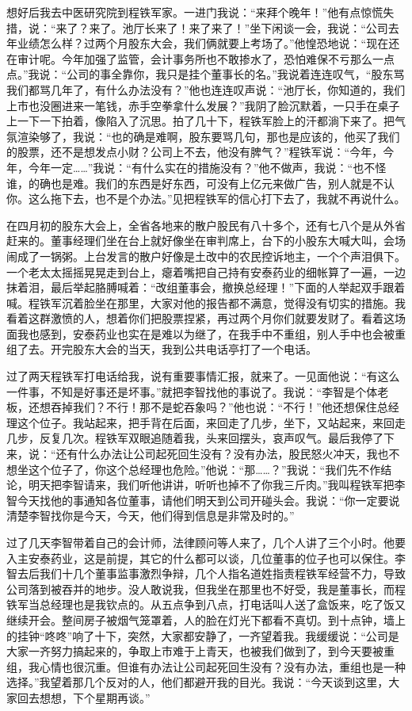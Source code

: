 \documentclass[12pt,oneside]{book}
\begin{document}
想好后我去中医研究院到程铁军家。一进门我说：``来拜个晚年！''他有点惊慌失措，说：``来了？来了。池厅长来了！来了来了！''坐下闲谈一会，我说：``公司去年业绩怎么样？过两个月股东大会，我们俩就要上考场了。''他惶恐地说：``现在还在审计呢。今年加强了监管，会计事务所也不敢掺水了，恐怕难保不亏那么一点点。''我说：``公司的事全靠你，我只是挂个董事长的名。''我说着连连叹气，``股东骂我们都骂几年了，有什么办法没有？''他也连连叹声说：``池厅长，你知道的，我们上市也没圈进来一笔钱，赤手空拳拿什么发展？''我阴了脸沉默着，一只手在桌子上一下一下拍着，像陷入了沉思。拍了几十下，程铁军脸上的汗都淌下来了。把气氛渲染够了，我说：``也的确是难啊，股东要骂几句，那也是应该的，他买了我们的股票，还不是想发点小财？公司上不去，他没有脾气？''程铁军说：``今年，今年，今年一定\ldots\ldots{}''我说：``有什么实在的措施没有？''他不做声，我说：``也不怪谁，的确也是难。我们的东西是好东西，可没有上亿元来做广告，别人就是不认你。这么拖下去，也不是个办法。''见把程铁军的信心打下去了，我就不再说什么。

在四月初的股东大会上，全省各地来的散户股民有八十多个，还有七八个是从外省赶来的。董事经理们坐在台上就好像坐在审判席上，台下的小股东大喊大叫，会场闹成了一锅粥。上台发言的散户好像是土改中的农民控诉地主，一个个声泪俱下。一个老太太摇摇晃晃走到台上，瘪着嘴把自己持有安泰药业的细帐算了一遍，一边抹着泪，最后举起胳膊喊着：``改组董事会，撤换总经理！''下面的人举起双手跟着喊。程铁军沉着脸坐在那里，大家对他的报告都不满意，觉得没有切实的措施。我看着这群激愤的人，想着你们把股票捏紧，再过两个月你们就要发财了。看着这场面我也感到，安泰药业也实在是难以为继了，在我手中不重组，别人手中也会被重组了去。开完股东大会的当天，我到公共电话亭打了一个电话。

过了两天程铁军打电话给我，说有重要事情汇报，就来了。一见面他说：``有这么一件事，不知是好事还是坏事。''就把李智找他的事说了。我说：``李智是个体老板，还想吞掉我们？不行！那不是蛇吞象吗？''他也说：``不行！''他还想保住总经理这个位子。我站起来，把手背在后面，来回走了几步，坐下，又站起来，来回走几步，反复几次。程铁军双眼追随着我，头来回摆头，哀声叹气。最后我停了下来，说：``还有什么办法让公司起死回生没有？没有办法，股民怒火冲天，我也不想坐这个位子了，你这个总经理也危险。''他说：``那\ldots\ldots ？''我说：``我们先不作结论，明天把李智请来，我们听他讲讲，听听也掉不了你我三斤肉。''我叫程铁军把李智今天找他的事通知各位董事，请他们明天到公司开碰头会。我说：``你一定要说清楚李智找你是今天，今天，他们得到信息是非常及时的。''

过了几天李智带着自己的会计师，法律顾问等人来了，几个人讲了三个小时。他要入主安泰药业，这是前提，其它的什么都可以谈，几位董事的位子也可以保住。李智去后我们十几个董事监事激烈争辩，几个人指名道姓指责程铁军经营不力，导致公司落到被吞并的地步。没人敢说我，但我坐在那里也不好受，我是董事长，而程铁军当总经理也是我钦点的。从五点争到八点，打电话叫人送了盒饭来，吃了饭又继续开会。整间房子被烟气笼罩着，人的脸在灯光下都看不真切。到十点钟，墙上的挂钟``咚咚''响了十下，突然，大家都安静了，一齐望着我。我缓缓说：``公司是大家一齐努力搞起来的，争取上市难于上青天，也被我们做到了，到今天要被重组，我心情也很沉重。但谁有办法让公司起死回生没有？没有办法，重组也是一种选择。''我望着那几个反对的人，他们都避开我的目光。我说：``今天谈到这里，大家回去想想，下个星期再谈。''
\end{document}
